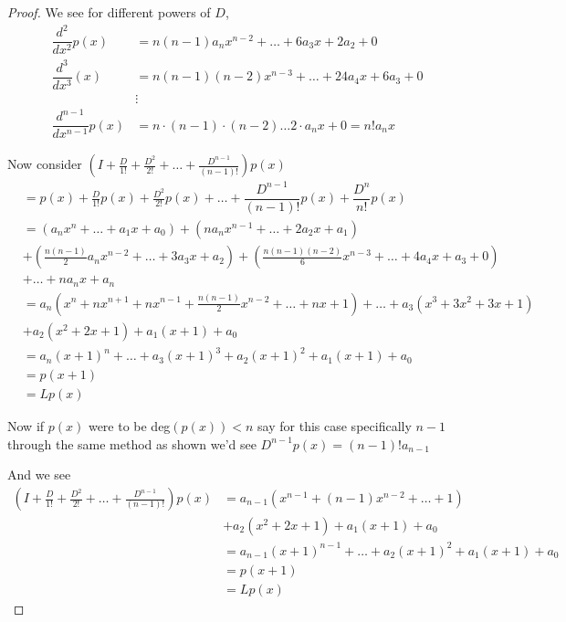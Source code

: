 \documentclass[12pt]{article}
\begin{document}
\begin{itemize}
\begin{proof}
        We see for different powers of $D$,
        \begin{align*}
            \dfrac{d^2}{dx^2}p(x) &= n(n-1)a_nx^{n-2} + \dots + 6a_3x + 2a_2 + 0 \\
            \dfrac{d^3}{dx^3}(x) &= n(n-1)(n-2)x^{n-3} + \dots + 24a_4x + 6a_3 + 0 \\
            &\vdots \\
            \dfrac{d^{n-1}}{dx^{n-1}}p(x) &= n\cdot(n-1)\cdot(n-2)\dots 2\cdot a_n x + 0 = n!a_nx
        \end{align*}

        Now consider $\left(I + \frac{D}{1!} + \frac{D^2}{2!} + \dots + \frac{D^{n-1}}{(n - 1)!}\right)p(x)$ 
        \begin{align*}
            &= p(x) + \frac{D}{1!}p(x) + \frac{D^2}{2!}p(x)   + \dots + \dfrac{D^{n-1}}{(n-1)!}p(x) + \dfrac{D^n}{n!}p(x) \\
            &= (a_nx^n + \dots + a_1x + a_0) + (na_nx^{n-1} + \dots + 2a_2x + a_1)  \\
            &+ (\frac{n(n-1)}{2}a_nx^{n-2} + \dots + 3a_3x + a_2)  + (\frac{n(n-1)(n-2)}{6}x^{n-3} + \dots + 4a_4x + a_3 + 0) \\
            &+ \dots + na_nx + a_n \\
            &= a_n(x^n + nx^{n+1} + nx^{n-1} + \frac{n(n-1)}{2}x^{n-2} + \dots + nx + 1) + \dots + a_3(x^3 + 3x^2 + 3x + 1) \\
            &+ a_2(x^2 + 2x + 1) + a_1(x+1) + a_0 \\
            &= a_n(x+1)^n + \dots + a_3(x+1)^3 + a_2(x+1)^2 + a_1(x+1) + a_0 \\
            &= p(x+1) \\
            &= Lp(x)
        \end{align*}

        Now if $p(x)$ were to be deg$(p(x)) < n$ say for this case specifically $n-1$ through the same method as shown we'd see $D^{n-1}p(x) = (n-1)!a_{n-1}$

        And we see 
        \begin{align*}
            \left(I + \frac{D}{1!} + \frac{D^2}{2!} + \dots + \frac{D^{n-1}}{(n - 1)!}\right)p(x) &= a_{n-1}(x^{n-1} + (n-1)x^{n-2} + \dots + 1) \\ &+ a_2(x^2 + 2x + 1) + a_1(x+1) + a_0 \\
            &= a_{n-1}(x+1)^{n-1} + \dots + a_2(x+1)^2 + a_1(x+1) + a_0 \\
           &= p(x+1) \\
           &= Lp(x) 
        \end{align*}


\end{proof}
\end{itemize}
\end{document}
